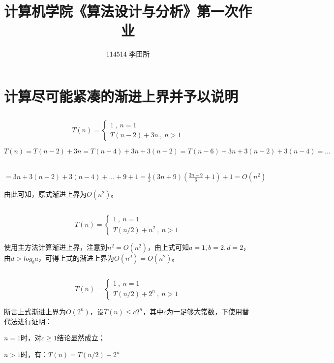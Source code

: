 \documentclass{article}
\title{\heiti 计算机学院《算法设计与分析》第一次作业}
\author{114514 李田所}
\begin{document}
\maketitle

\section{计算尽可能紧凑的渐进上界并予以说明}

\subsection{}

$$
T(n)=\left\{
\begin{array}{l}
1\ ,\ n=1\\
T(n-2)+3n\ ,\ n>1
\end{array}
\right.
$$

$T(n)=T(n-2)+3n=T(n-4)+3n+3(n-2)=T(n-6)+3n+3(n-2)+3(n-4)=...$

\qquad\ $=3n+3(n-2)+3(n-4)+...+9+1=\frac{1}{2}(3n+9)(\frac{3n-9}{6}+1)+1=O(n^2)$

由此可知，原式渐进上界为$O(n^2)$。

\subsection{}

$$
T(n)=\left\{
\begin{array}{l}
1\ ,\ n=1\\
T(n/2)+n^2\ ,\ n>1
\end{array}
\right.
$$

使用主方法计算渐进上界，注意到$n^2=O(n^2)$，由上式可知$a=1,b=2,d=2$，由$d>log_b a$，可得上式的渐进上界为$O(n^d)=O(n^2)$。

\subsection{}

$$
T(n)=\left\{
\begin{array}{l}
1\ ,\ n=1\\
T(n/2)+2^n\ ,\ n>1
\end{array}
\right.
$$

断言上式渐进上界为$O(2^n)$，设$T(n)\le{c2^n}$，其中$c$为一足够大常数，下使用替代法进行证明：

\qquad$n=1$时，对$c\ge1$结论显然成立；

\qquad$n>1$时，有：$T(n)=T(n/2)+2^n$
\end{document}
